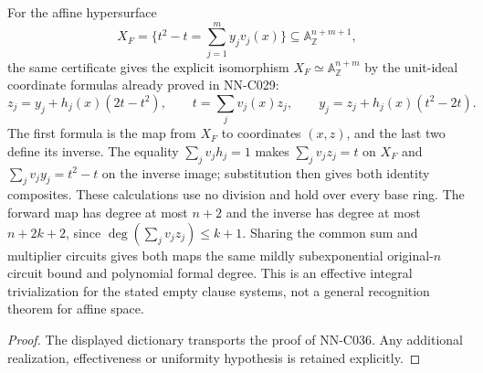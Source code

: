 \begin{geometricstatement}[NN-C036]
For the affine hypersurface
\[
 X_F=\{t^2-t=\sum_{j=1}^m y_jv_j(x)\}
                          \subseteq\mathbb A^{n+m+1}_{\mathbb Z},
\]
the same certificate gives the explicit isomorphism
$X_F\simeq\mathbb A^{n+m}_{\mathbb Z}$ by the unit-ideal
coordinate formulas already proved in NN-C029:
\[
 z_j=y_j+h_j(x)(2t-t^2),\qquad
 t=\sum_jv_j(x)z_j,\qquad
 y_j=z_j+h_j(x)(t^2-2t).
\]
The first formula is the map from $X_F$ to coordinates
$(x,z)$, and the last two define its inverse.  The equality
$\sum_jv_jh_j=1$ makes $\sum_jv_jz_j=t$ on $X_F$ and
$\sum_jv_jy_j=t^2-t$ on the inverse image; substitution
then gives both identity composites.  These calculations
use no division and hold over every base ring.  The forward
map has degree at most $n+2$ and the inverse has degree at
most $n+2k+2$, since $\deg(\sum_jv_jz_j)\le k+1$.
Sharing the common sum and multiplier circuits gives both
maps the same mildly subexponential original-$n$ circuit
bound and polynomial formal degree.  This is an effective
integral trivialization for the stated empty clause systems,
not a general recognition theorem for affine space.
\end{geometricstatement}
\begin{proof} The displayed dictionary transports the proof of NN-C036. Any additional realization, effectiveness or uniformity hypothesis is retained explicitly.\end{proof}


